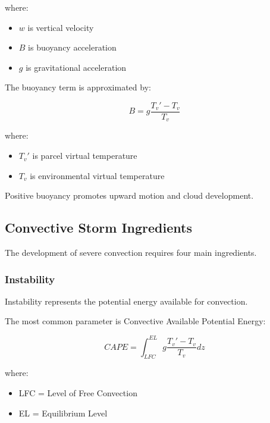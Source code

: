 where:

\begin{itemize}

\item $w$ is vertical velocity

\item $B$ is buoyancy acceleration

\item $g$ is gravitational acceleration

\end{itemize}


The buoyancy term is approximated by:

\[
B=g
\frac{T_v'-T_v}{T_v}
\]

where:

\begin{itemize}

\item $T_v'$ is parcel virtual temperature

\item $T_v$ is environmental virtual temperature

\end{itemize}

Positive buoyancy promotes upward motion and cloud development.


\subsection{Convective Storm Ingredients}

The development of severe convection requires four main ingredients.

\subsubsection{Instability}

Instability represents the potential energy available for convection.

The most common parameter is Convective Available Potential Energy:

\[
CAPE=
\int_{LFC}^{EL}
g
\frac{T_v'-T_v}{T_v}
dz
\]

where:

\begin{itemize}

\item LFC = Level of Free Convection

\item EL = Equilibrium Level

\end{itemize}


